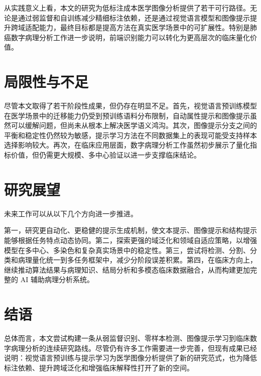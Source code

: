 从实践意义上看，本文的研究为低标注成本医学图像分析提供了若干可行路径。无论是通过弱监督和自训练减少精细标注依赖，还是通过视觉语言模型和图像提示提升跨域适配能力，最终目标都是提高方法在真实医学场景中的可扩展性。特别是肺癌数字病理分析工作进一步说明，前端识别能力可以转化为更高层次的临床量化价值。

\section{局限性与不足}
尽管本文取得了若干阶段性成果，但仍存在明显不足。首先，视觉语言预训练模型在医学场景中的迁移能力仍受到预训练语料分布限制，自动属性提示和图像提示虽然可以缓解问题，但尚未从根本上解决医学语义鸿沟。其次，图像提示分支之间的平衡和稳定性仍然较为敏感，提示学习方法在不同数据集上的表现可能受支持样本选择影响较大。再次，在临床应用层面，数字病理分析工作虽然初步展示了量化指标价值，但仍需更大规模、多中心验证以进一步支撑临床结论。

\section{研究展望}
未来工作可以从以下几个方向进一步推进。

第一，研究更自动化、更稳健的提示生成机制，使文本提示、图像提示和结构提示能够根据任务特点动态协同。第二，探索更强的域泛化和领域自适应策略，以增强模型在多中心、多染色和复杂真实场景中的稳定性。第三，尝试将检测、分割、分类和病理量化统一到多任务框架中，减少分阶段误差积累。第四，在临床方向上，继续推动算法结果与病理知识、结局分析和多模态临床数据融合，从而构建更加完整的 AI 辅助病理分析系统。

\section{结语}
总体而言，本文尝试构建一条从弱监督识别、零样本检测、图像提示学习到临床数字病理分析的连续研究路线。尽管仍有许多工作需要进一步完善，但现有成果已经说明：视觉语言预训练与提示学习为医学图像分析提供了新的研究范式，也为降低标注依赖、提升跨域泛化和增强临床解释性打开了新的空间。
